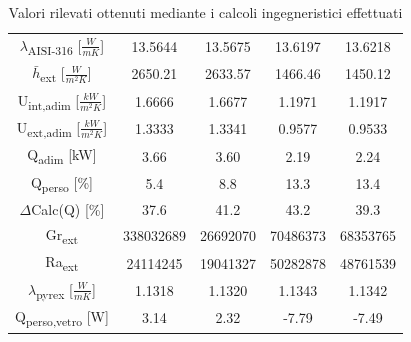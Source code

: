 \documentclass[a4paper,10pt]{article}                                                                                       %
\begin{document}
\begin{table}[ht!]
\begin{tabular}{||c|c|c|c|c||}
    $\lambda$\textsubscript{AISI-316} [$\frac{W}{mK}$]        & 13.5644         & 13.5675           & 13.6197           & 13.6218         \\
    $\bar{h}$\textsubscript{ext} [$\frac{W}{m^{2}K}$]         & 2650.21         & 2633.57           & 1466.46           & 1450.12         \\
    U\textsubscript{int,adim} [$\frac{kW}{m^{2}K}$]           & 1.6666          & 1.6677            & 1.1971            & 1.1917          \\
    U\textsubscript{ext,adim} [$\frac{kW}{m^{2}K}$]           & 1.3333          & 1.3341            & 0.9577            & 0.9533          \\
    Q\textsubscript{adim} [kW]                                & 3.66            & 3.60              & 2.19              & 2.24            \\
    Q\textsubscript{perso} [\%]                               & 5.4             & 8.8               & 13.3              & 13.4            \\
    $\Delta$Calc(Q) [\%]                                      & 37.6            & 41.2              & 43.2              & 39.3            \\
    Gr\textsubscript{ext}                                     & 338032689       & 26692070          & 70486373          & 68353765        \\
    Ra\textsubscript{ext}                                     & 24114245        & 19041327          & 50282878          & 48761539        \\
    $\lambda$\textsubscript{pyrex} [$\frac{W}{mK}$]           & 1.1318          & 1.1320            & 1.1343            & 1.1342          \\
    Q\textsubscript{perso,vetro} [W]                          & 3.14            & 2.32              & -7.79             & -7.49           \\
    \hline
  \end{tabular}                                                                                                             %
  \caption{Valori rilevati ottenuti mediante i calcoli ingegneristici effettuati}                                           %
  \label{tab:measures_calcs}                                                                                                %
\end{table}                                                                                                                 %
\end{document}
